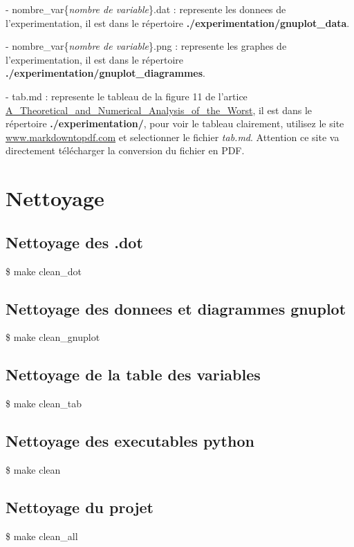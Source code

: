 \documentclass{article}
\begin{document}
\tabto{1cm} -  nombre\_var\{\textit{nombre de variable}\}.dat : represente les donnees de l'experimentation, il est dans le répertoire \textbf{./experimentation/gnuplot\_data}.

\tabto{1cm} -  nombre\_var\{\textit{nombre de variable}\}.png : represente les graphes de l'experimentation, il est dans le répertoire \textbf{./experimentation/gnuplot\_diagrammes}.

\tabto{1cm} -  tab.md : represente le tableau de la figure 11 de l'artice \href{https://www-apr.lip6.fr/~genitrini/doc_ens/A_Theoretical_and_Numerical_Analysis_of_the_Worst.pdf}{A\_Theoretical\_and\_Numerical\_Analysis\_of\_the\_Worst}, il est dans le répertoire \textbf{./experimentation/}, pour voir le tableau clairement, utilisez le site \href{https://www.markdowntopdf.com/}{www.markdowntopdf.com} et selectionner le fichier \textit{tab.md}. Attention ce site va directement télécharger la conversion du fichier en PDF.


\section{Nettoyage}
\subsection{Nettoyage des .dot}
\$ make clean\_dot
\subsection{Nettoyage des donnees et diagrammes gnuplot}
\$ make clean\_gnuplot
\subsection{Nettoyage de la table des variables}
\$ make clean\_tab
\subsection{Nettoyage des executables python}
\$ make clean
\subsection{Nettoyage du projet}
\$ make clean\_all
\end{document}
